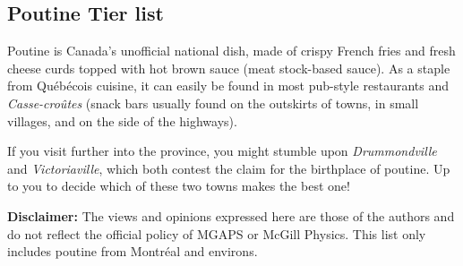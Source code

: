 \subsection*{Poutine Tier list}

\noindent Poutine is Canada's unofficial national dish, made of crispy French fries and fresh cheese curds topped with hot brown sauce (meat stock-based sauce). As a staple from Québécois cuisine, it can easily be found in most pub-style restaurants and \textit{Casse-croûtes} (snack bars usually found on the outskirts of towns, in small villages, and on the side of the highways). 

If you visit further into the province, you might stumble upon \textit{Drummondville} and \textit{Victoriaville}, which both contest the claim for the birthplace of poutine. Up to you to decide which of these two towns makes the best one!

\noindent\textbf{\color{ocre}Disclaimer:} The views and opinions expressed here are those of the authors and do not reflect the official policy of MGAPS or McGill Physics. This list only includes poutine from Montréal and environs.

\newcommand{\tieritem}[1]{%
    \tcbox[on line, size=small, colback=white, colframe=gray!50]{#1}\;}
    
